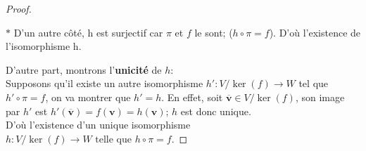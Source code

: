 \documentclass[11pt,a4paper,oneside]{book}
\newtheorem{rem}{Remarque}[chapter]
\newtheorem{proof}{Démonstration}
\def\K{\mathbb K}
\def\v{\mathbf v}
\begin{document}
\begin{proof}
\begin{list}{$ \ast $}{}
D'un autre côté, h est surjectif car $ \pi $ et $ f $ le sont; ($ h\circ \pi=f $). D'où l'existence de l'isomorphisme h.\\
\end{list}
D'autre part, montrons l'\textbf{unicité} de $ h $:\\
Supposons qu'il existe un autre isomorphisme $ h':V/\ker (f)\longrightarrow W $ tel que $ h'\circ \pi=f $, on va montrer que $ h'=h $. En effet, soit $\overline{\v}\in V/\ker(f)$, son image par $ h' $ est $ h'(\overline{\v})=f(\v)=h(\v) $; $ h $ est donc unique.\\
D'où l'existence d'un unique isomorphisme $ h : V/\ker(f)\longrightarrow W\text{ telle que } h\circ\pi=f. $
\end{proof}
%
%
%
%
\end{document}
